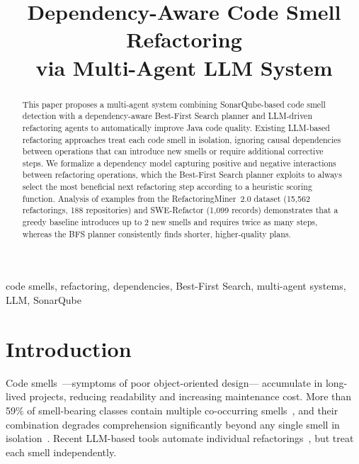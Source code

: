 \documentclass[conference]{IEEEtran}
\begin{document}
\title{Dependency-Aware Code Smell Refactoring\\via Multi-Agent LLM System}

\author{
}

\maketitle

\begin{abstract}
This paper proposes a multi-agent system combining SonarQube-based code smell
detection with a dependency-aware Best-First Search planner and LLM-driven
refactoring agents to automatically improve Java code quality.
Existing LLM-based refactoring approaches treat each code smell in isolation,
ignoring causal dependencies between operations that can introduce new smells
or require additional corrective steps.
We formalize a dependency model capturing positive and negative interactions
between refactoring operations, which the Best-First Search planner exploits
to always select the most beneficial next refactoring step according to a
heuristic scoring function.
Analysis of examples from the RefactoringMiner~2.0 dataset (15,562 refactorings,
188 repositories) and SWE-Refactor (1,099 records) demonstrates that a greedy
baseline introduces up to 2 new smells and requires twice as many steps,
whereas the BFS planner consistently finds shorter, higher-quality plans.
\end{abstract}

\begin{IEEEkeywords}
code smells, refactoring, dependencies, Best-First Search,
multi-agent systems, LLM, SonarQube
\end{IEEEkeywords}

\section{Introduction}

Code smells~\cite{Fowler1999}---symptoms of poor object-oriented design---
accumulate in long-lived projects, reducing readability and increasing
maintenance cost.
More than 59\% of smell-bearing classes contain multiple co-occurring
smells~\cite{palomba2018diffuseness}, and their combination degrades
comprehension significantly beyond any single smell in
isolation~\cite{abbes2011empirical}.
Recent LLM-based tools automate individual refactorings~\cite{10.1145/3691620.3695508,liang2025smelldetector},
but treat each smell independently.
\end{document}
